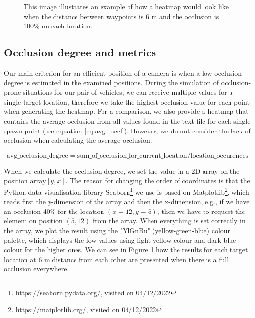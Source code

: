 \begin{figure} [h!]
    \centering
    
    \caption[Heatmap target full occlusion]{This image illustrates an example of how a heatmap would look like when the distance between waypoints is 6 m and the occlusion is 100\% on each location.}
    \label{fig:heatmap_target}
\end{figure}
 
\subsection{Occlusion degree and metrics} \label{subsec:metrics}
Our main criterion for an efficient position of a camera is when a low occlusion degree is estimated in the examined positions. During the simulation of occlusion-prone situations for our pair of vehicles, we can receive multiple values for a single target location, therefore we take the highest occlusion value for each point when generating the heatmap. For a comparison, we also provide a heatmap that contains the average occlusion from all values found in the text file for each single spawn point (see equation \ref{eq:avg_occl}). However, we do not consider the lack of occlusion when calculating the average occlusion.  

\begin{equation}
    \textrm{avg\_occlusion\_degree} = \textrm{sum\_of\_occlusion\_for\_current\_location} / \textrm{location\_occurences}\label{eq:avg_occl}
\end{equation}

When we calculate the occlusion degree, we set the value in a 2D array on the position $\textrm{array}[y,x]$. The reason for changing the order of coordinates is that the Python data visualisation library Seaborn\footnote{\url{https://seaborn.pydata.org/}, visited on 04/12/2022} we use is based on Matplotlib\footnote{\url{https://matplotlib.org/}, visited on 04/12/2022}, which reads first the y-dimension of the array and then the x-dimension, e.g., if we have an occlusion 40\% for the location $(x=12,y=5)$, then we have to request the element on position $(5,12)$ from the array. When everything is set correctly in the array, we plot the result using the "YlGnBu" (yellow-green-blue) colour palette, which displays the low values using light yellow colour and dark blue colour for the higher ones. We can see in Figure \ref{fig:heatmap_target} how the results for each target location at 6 m distance from each other are presented when there is a full occlusion everywhere. 

